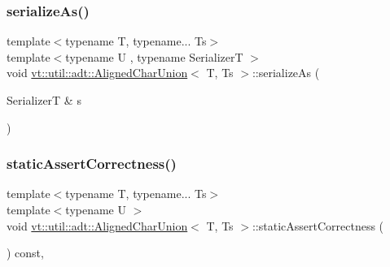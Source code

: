 \subsubsection{\texorpdfstring{serialize\+As()}{serializeAs()}}
{\footnotesize\ttfamily template$<$typename T, typename... Ts$>$ \\
template$<$typename U , typename SerializerT $>$ \\
void \hyperlink{structvt_1_1util_1_1adt_1_1_aligned_char_union}{vt\+::util\+::adt\+::\+Aligned\+Char\+Union}$<$ T, Ts $>$\+::serialize\+As (\begin{DoxyParamCaption}\item[{SerializerT \&}]{s }\end{DoxyParamCaption})\hspace{0.3cm}{\ttfamily [inline]}}

\mbox{\label{structvt_1_1util_1_1adt_1_1_aligned_char_union_a5be41aefcdc73b5f10102991b2aa8bfc}} 
\subsubsection{\texorpdfstring{static\+Assert\+Correctness()}{staticAssertCorrectness()}}
{\footnotesize\ttfamily template$<$typename T, typename... Ts$>$ \\
template$<$typename U $>$ \\
void \hyperlink{structvt_1_1util_1_1adt_1_1_aligned_char_union}{vt\+::util\+::adt\+::\+Aligned\+Char\+Union}$<$ T, Ts $>$\+::static\+Assert\+Correctness (\begin{DoxyParamCaption}{ }\end{DoxyParamCaption}) const\hspace{0.3cm}{\ttfamily [inline]}, {\ttfamily [private]}}

\mbox{\label{structvt_1_1util_1_1adt_1_1_aligned_char_union_a27ee4ceddaa0fda39ef9be9164959f11}} 
